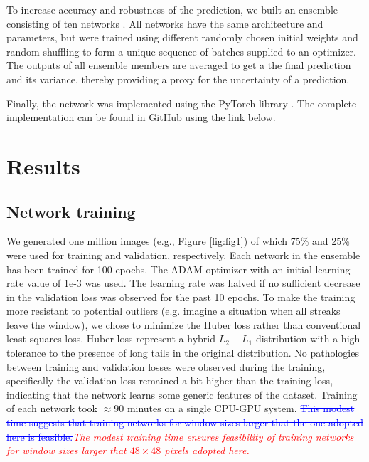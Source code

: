 \documentclass{svjour3}                     %
\newcommand{\new}[1]{\textit{\textcolor{red}{#1}}}
\newcommand{\old}[1]{\textcolor{blue}{\sout{#1}}}
\begin{document}
To increase accuracy and robustness of the prediction, we built an ensemble consisting of ten networks \cite{hinton2015distilling}. All networks have the same architecture and parameters, but were trained using different randomly chosen initial weights \cite{glorot2010understanding, he2015delving} and random shuffling to form a unique sequence of batches supplied to an optimizer. The outputs of all ensemble members are averaged to get a the final prediction and its variance, thereby providing a proxy for the uncertainty of a prediction.

Finally, the network was implemented using the PyTorch library \cite{paszke2017automatic}. The complete implementation can be found in GitHub using the link below.

\section{Results}

\subsection{Network training}

We generated one million images (e.g., Figure \ref{fig:fig1}) of which 75\% and 25\% were used for training and validation, respectively. Each network in the ensemble has been trained for 100 epochs. The ADAM optimizer with an initial learning rate value of 1e-3 was used. The learning rate was halved if no sufficient decrease in the validation loss was observed for the past 10 epochs. To make the training more resistant to potential outliers (e.g. imagine a situation when all streaks leave the window), we chose to minimize the Huber loss \cite{huber1973robust} rather than conventional least-squares loss. Huber loss represent a hybrid $L_2-L_1$ distribution with a high tolerance to the presence of long tails in the original distribution. 
No pathologies between training and validation losses were observed during the training, specifically the validation loss remained a bit higher than the training loss, indicating that the network learns some generic features of the dataset. Training of each network took $\approx 90$ minutes on a single CPU-GPU system. \old{This modest time suggests that training networks for window sizes larger that the one adopted here is feasible.}\new{The modest training time ensures feasibility of training networks for window sizes larger that $48 \times 48$ pixels adopted here.}
\end{document}
